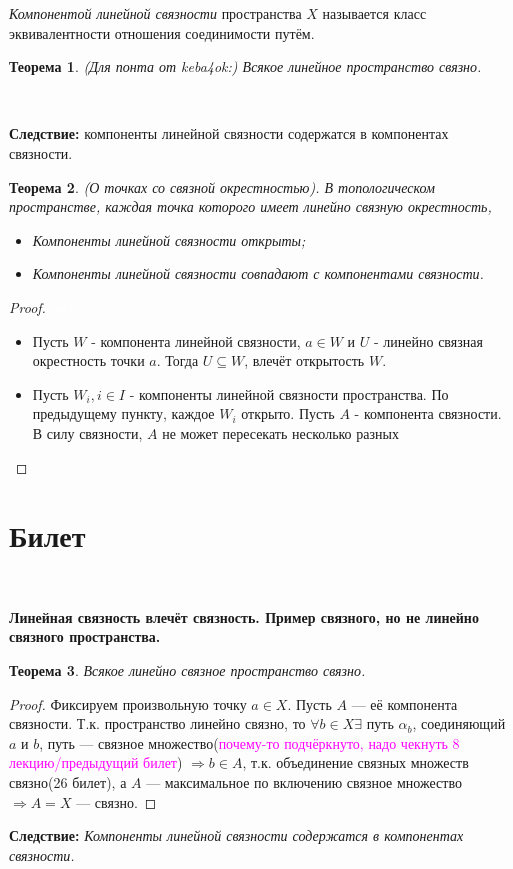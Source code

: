 \documentclass[a4paper,100pt]{article}
\theoremstyle{indented}
\newtheorem{theorem}{Теорема}
\begin{document}
\textit{Компонентой линейной связности} пространства $X$ называется класс эквивалентности отношения соединимости путём.\\

\begin{theorem}
    (Для понта от keba4ok:) Всякое линейное пространство связно.
\end{theorem}
\

\textbf{Следствие:} компоненты линейной связности содержатся в компонентах связности.
\\
\begin{theorem}
    (О точках со связной окрестностью). В топологическом пространстве, каждая точка которого имеет линейно связную окрестность,
    \begin{itemize}
        \item Компоненты линейной связности открыты;
        \item Компоненты линейной связности совпадают с компонентами связности.
    \end{itemize}
\end{theorem}

\begin{proof} \textcolor{white}{fuck}\

    \begin{itemize}
        \item Пусть $W$ - компонента линейной связности, $a\in W$ и $U$ - линейно связная окрестность точки $a$. Тогда $U\subseteq W$, влечёт открытость $W$.
        \item Пусть $W_i, i\in I$ - компоненты линейной связности пространства. По предыдущему пункту, каждое $W_i$ открыто. Пусть $A$ - компонента связности. В силу связности, $A$ не может пересекать несколько разных 
    \end{itemize}
\end{proof}


\section{Билет} \

\medskip

\textbf{Линейная связность влечёт связность. Пример связного, но не линейно связного пространства.}\\
    
    \begin{theorem}
        Всякое линейно связное пространство связно.
    \end{theorem}
    \begin{proof}
        Фиксируем произвольную точку $a \in X$. Пусть $A$ --- её компонента связности. Т.к. пространство линейно связно, то $\forall b \in X \exists$ путь $\alpha_b$, соединяющий $a$ и $b$, путь --- связное множество(\textcolor{magenta}{почему-то подчёркнуто, надо чекнуть 8 лекцию/предыдущий билет}) $\Rightarrow b \in A$, т.к. объединение связных множеств связно(26 билет), а $A$ --- максимальное по включению связное множество $\Rightarrow A = X$ --- связно.
    \end{proof}
    \textbf{Следствие:} \textit{Компоненты линейной связности содержатся в компонентах связности.}\\
    
\end{document}
